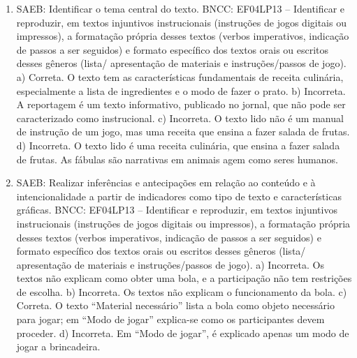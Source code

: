 \begin{enumerate}
\item
SAEB: Identificar o tema central do texto.
BNCC: EF04LP13 -- Identificar e reproduzir, em textos injuntivos
instrucionais (instruções de jogos digitais ou impressos), a formatação
própria desses textos (verbos imperativos, indicação de passos a ser
seguidos) e formato específico dos textos orais ou escritos desses
gêneros (lista/ apresentação de materiais e instruções/passos de jogo).
a) Correta. O texto tem as características fundamentais de receita
culinária, especialmente a lista de ingredientes e o modo de fazer o prato.
b) Incorreta. A reportagem é um texto informativo, publicado no jornal, 
que não pode ser caracterizado como instrucional.
c) Incorreta. O texto lido não é um manual de instrução de um jogo, mas
uma receita que ensina a fazer salada de frutas.  
d) Incorreta. O texto lido é uma receita culinária, que ensina a fazer 
salada de frutas. As fábulas são narrativas em animais agem como seres
humanos.

\item
SAEB: Realizar inferências e antecipações em relação ao conteúdo e
à intencionalidade a partir de indicadores como tipo de texto e
características gráficas.
BNCC: EF04LP13 -- Identificar e reproduzir, em textos injuntivos
instrucionais (instruções de jogos digitais ou impressos), a formatação
própria desses textos (verbos imperativos, indicação de passos a ser
seguidos) e formato específico dos textos orais ou escritos desses
gêneros (lista/ apresentação de materiais e instruções/passos de jogo).
a) Incorreta. Os textos não explicam como obter uma bola, e a 
participação não tem restrições de escolha.  
b) Incorreta. Os textos não explicam o funcionamento da bola.
c) Correta. O texto ``Material necessário'' lista a bola como objeto 
necessário para jogar; em ``Modo de jogar'' explica-se como os 
participantes devem proceder.
d) Incorreta. Em ``Modo de jogar'', é explicado apenas um modo de jogar
a brincadeira.


\end{enumerate}
